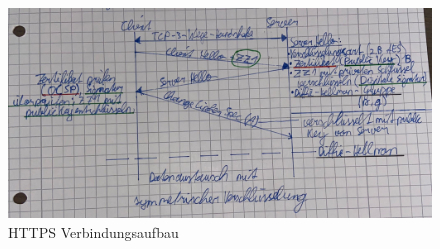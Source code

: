 \begin{figure}[H]
	\centering
	\includegraphics[width=1.0\linewidth]{figures/https.jpeg}
	\caption{HTTPS Verbindungsaufbau}
\end{figure}









